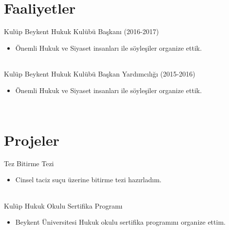 \documentclass[letterpaper]{alibk} %
\begin{document}
\section{Faaliyetler}

\begin{twenty} %
	\twentyitem
	{Kulüp}
	{}
	{\hspace{0.3cm}Beykent Hukuk Kulübü Başkanı (2016-2017) }
	{}
	{}
	{\begin{itemize}
			\item Önemli Hukuk ve Siyaset insanları ile söyleşiler organize ettik.

	\end{itemize}}
	\\
	\twentyitem
	{Kulüp}
	{}
	{\hspace{0.3cm}Beykent Hukuk Kulübü Başkan Yardımcılığı (2015-2016) }
	{}
	{}
	{\begin{itemize}
			\item Önemli Hukuk ve Siyaset insanları ile söyleşiler organize ettik.
	\end{itemize}}
	\\
	
\end{twenty}


\section{Projeler}

\begin{twenty} %
	\twentyitem
	{Tez}
	{}
	{\hspace{0.3cm}Bitirme Tezi }
	{}
	{}
	{\begin{itemize}
			\item Cinsel taciz suçu üzerine bitirme tezi hazırladım.
			
	\end{itemize}}
	\\
	\twentyitem
	{Kulüp}
	{}
	{\hspace{0.3cm}Hukuk Okulu Sertifika Programı}
	{}
	{}
	{\begin{itemize}
			\item Beykent Üniversitesi Hukuk okulu sertifika programını organize ettim.
	\end{itemize}}
	\\
	
\end{twenty}
\end{document}
